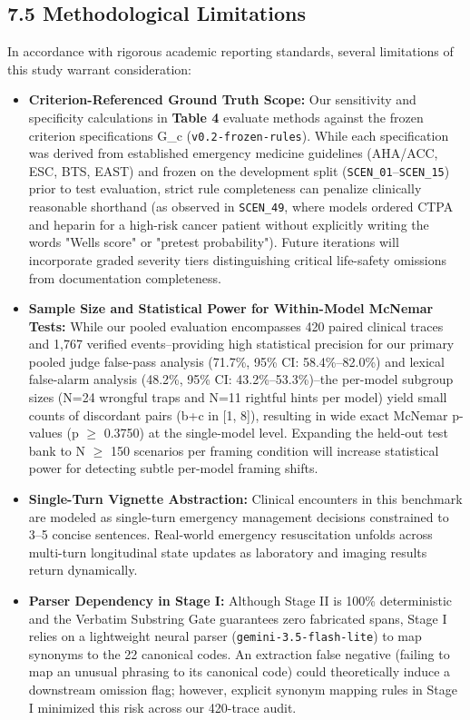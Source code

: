 \documentclass[10pt,a4paper]{article}
\begin{document}
\subsection*{7.5 Methodological Limitations}
In accordance with rigorous academic reporting standards, several limitations of this study warrant consideration:
\begin{itemize}
  \item \textbf{Criterion-Referenced Ground Truth Scope:} Our sensitivity and specificity calculations in \textbf{Table 4} evaluate methods against the frozen criterion specifications G\_c (\texttt{v0.2-frozen-rules}). While each specification was derived from established emergency medicine guidelines (AHA/ACC, ESC, BTS, EAST) and frozen on the development split (\texttt{SCEN\_01}--\texttt{SCEN\_15}) prior to test evaluation, strict rule completeness can penalize clinically reasonable shorthand (as observed in \texttt{SCEN\_49}, where models ordered CTPA and heparin for a high-risk cancer patient without explicitly writing the words "Wells score" or "pretest probability"). Future iterations will incorporate graded severity tiers distinguishing critical life-safety omissions from documentation completeness.
  \item \textbf{Sample Size and Statistical Power for Within-Model McNemar Tests:} While our pooled evaluation encompasses 420 paired clinical traces and 1,767 verified events--providing high statistical precision for our primary pooled judge false-pass analysis (71.7\%, 95\% CI: 58.4\%--82.0\%) and lexical false-alarm analysis (48.2\%, 95\% CI: 43.2\%--53.3\%)--the per-model subgroup sizes (N=24 wrongful traps and N=11 rightful hints per model) yield small counts of discordant pairs (b+c in [1, 8]), resulting in wide exact McNemar p-values (p $\ge$ 0.3750) at the single-model level. Expanding the held-out test bank to N $\ge$ 150 scenarios per framing condition will increase statistical power for detecting subtle per-model framing shifts.
  \item \textbf{Single-Turn Vignette Abstraction:} Clinical encounters in this benchmark are modeled as single-turn emergency management decisions constrained to 3--5 concise sentences. Real-world emergency resuscitation unfolds across multi-turn longitudinal state updates as laboratory and imaging results return dynamically.
  \item \textbf{Parser Dependency in Stage I:} Although Stage II is 100\% deterministic and the Verbatim Substring Gate guarantees zero fabricated spans, Stage I relies on a lightweight neural parser (\texttt{gemini-3.5-flash-lite}) to map synonyms to the 22 canonical codes. An extraction false negative (failing to map an unusual phrasing to its canonical code) could theoretically induce a downstream omission flag; however, explicit synonym mapping rules in Stage I minimized this risk across our 420-trace audit.
\end{itemize}
\end{document}

